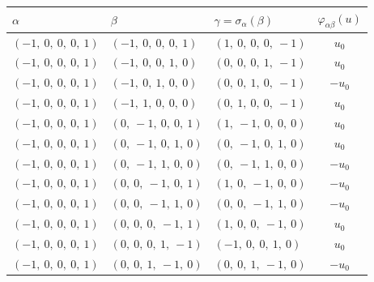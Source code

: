 \documentclass[11pt]{article}
\newcommand{\noi}{\noindent}
\theoremstyle{definition}
\begin{document}
\noi \noindent \begin{longtable}{|l|l|l|c|}
    \hline
    \textbf{$\alpha$} & \textbf{$\beta$} & \textbf{$\gamma = \sigma_{\alpha}(\beta)$} & $\varphi_{\alpha\beta}(u)$ \\
    \hline
    \endhead
    $\left( -1, \  0, \  0, \  0, \  1\right)$ & $\left( -1, \  0, \  0, \  0, \  1\right)$ & $\left( 1, \  0, \  0, \  0, \  -1\right)$ & $u_{0}$ \\
    \hline
    $\left( -1, \  0, \  0, \  0, \  1\right)$ & $\left( -1, \  0, \  0, \  1, \  0\right)$ & $\left( 0, \  0, \  0, \  1, \  -1\right)$ & $u_{0}$ \\
    \hline
    $\left( -1, \  0, \  0, \  0, \  1\right)$ & $\left( -1, \  0, \  1, \  0, \  0\right)$ & $\left( 0, \  0, \  1, \  0, \  -1\right)$ & $- u_{0}$ \\
    \hline
    $\left( -1, \  0, \  0, \  0, \  1\right)$ & $\left( -1, \  1, \  0, \  0, \  0\right)$ & $\left( 0, \  1, \  0, \  0, \  -1\right)$ & $u_{0}$ \\
    \hline
    $\left( -1, \  0, \  0, \  0, \  1\right)$ & $\left( 0, \  -1, \  0, \  0, \  1\right)$ & $\left( 1, \  -1, \  0, \  0, \  0\right)$ & $u_{0}$ \\
    \hline
    $\left( -1, \  0, \  0, \  0, \  1\right)$ & $\left( 0, \  -1, \  0, \  1, \  0\right)$ & $\left( 0, \  -1, \  0, \  1, \  0\right)$ & $u_{0}$ \\
    \hline
    $\left( -1, \  0, \  0, \  0, \  1\right)$ & $\left( 0, \  -1, \  1, \  0, \  0\right)$ & $\left( 0, \  -1, \  1, \  0, \  0\right)$ & $- u_{0}$ \\
    \hline
    $\left( -1, \  0, \  0, \  0, \  1\right)$ & $\left( 0, \  0, \  -1, \  0, \  1\right)$ & $\left( 1, \  0, \  -1, \  0, \  0\right)$ & $- u_{0}$ \\
    \hline
    $\left( -1, \  0, \  0, \  0, \  1\right)$ & $\left( 0, \  0, \  -1, \  1, \  0\right)$ & $\left( 0, \  0, \  -1, \  1, \  0\right)$ & $- u_{0}$ \\
    \hline
    $\left( -1, \  0, \  0, \  0, \  1\right)$ & $\left( 0, \  0, \  0, \  -1, \  1\right)$ & $\left( 1, \  0, \  0, \  -1, \  0\right)$ & $u_{0}$ \\
    \hline
    $\left( -1, \  0, \  0, \  0, \  1\right)$ & $\left( 0, \  0, \  0, \  1, \  -1\right)$ & $\left( -1, \  0, \  0, \  1, \  0\right)$ & $u_{0}$ \\
    \hline
    $\left( -1, \  0, \  0, \  0, \  1\right)$ & $\left( 0, \  0, \  1, \  -1, \  0\right)$ & $\left( 0, \  0, \  1, \  -1, \  0\right)$ & $- u_{0}$ \\

\end{longtable}
\end{document}

